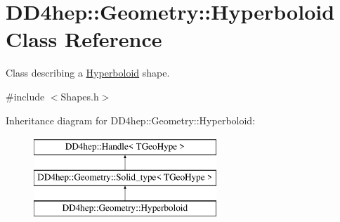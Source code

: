 \hypertarget{class_d_d4hep_1_1_geometry_1_1_hyperboloid}{}\section{D\+D4hep\+:\+:Geometry\+:\+:Hyperboloid Class Reference}
\label{class_d_d4hep_1_1_geometry_1_1_hyperboloid}


Class describing a \hyperlink{class_d_d4hep_1_1_geometry_1_1_hyperboloid}{Hyperboloid} shape.  




{\ttfamily \#include $<$Shapes.\+h$>$}

Inheritance diagram for D\+D4hep\+:\+:Geometry\+:\+:Hyperboloid\+:\begin{figure}[H]
\begin{center}
\leavevmode
\includegraphics[height=3.000000cm]{class_d_d4hep_1_1_geometry_1_1_hyperboloid}
\end{center}
\end{figure}
